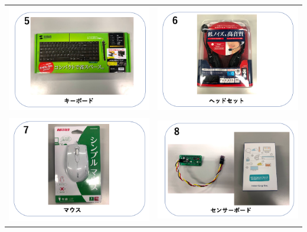 \documentclass[a4paper,12pt]{jarticle}
\begin{document}
\begin{tabular}{cc}
\includegraphics[width=6.488cm,height=4.697cm]{textbook-img005.png}
	&
\includegraphics[width=6.488cm,height=4.697cm]{textbook-img006.png} \\

\includegraphics[width=6.488cm,height=4.697cm]{textbook-img003.png}
	&
\includegraphics[width=6.488cm,height=4.697cm]{textbook-img004.png} \\


\end{tabular}
\end{document}
